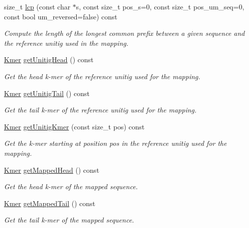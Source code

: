 \begin{DoxyCompactItemize}
size\+\_\+t \hyperlink{classUnitigMap_a2a80f5a0f55391c57b4f4d83400e30a2}{lcp} (const char $\ast$s, const size\+\_\+t pos\+\_\+s=0, const size\+\_\+t pos\+\_\+um\+\_\+seq=0, const bool um\+\_\+reversed=false) const
\begin{DoxyCompactList}\small\item\em Compute the length of the longest common prefix between a given sequence and the reference unitig used in the mapping. \end{DoxyCompactList}\item 
\hyperlink{classKmer}{Kmer} \hyperlink{classUnitigMap_a594c471e4d757273feef67cf4358bafd}{get\+Unitig\+Head} () const
\begin{DoxyCompactList}\small\item\em Get the head k-\/mer of the reference unitig used for the mapping. \end{DoxyCompactList}\item 
\hyperlink{classKmer}{Kmer} \hyperlink{classUnitigMap_a584488d223cb2f5b00d72342305c6d0e}{get\+Unitig\+Tail} () const
\begin{DoxyCompactList}\small\item\em Get the tail k-\/mer of the reference unitig used for the mapping. \end{DoxyCompactList}\item 
\hyperlink{classKmer}{Kmer} \hyperlink{classUnitigMap_a7c8a9b1e16fa29d716550fc93de9d4d7}{get\+Unitig\+Kmer} (const size\+\_\+t pos) const
\begin{DoxyCompactList}\small\item\em Get the k-\/mer starting at position pos in the reference unitig used for the mapping. \end{DoxyCompactList}\item 
\hyperlink{classKmer}{Kmer} \hyperlink{classUnitigMap_a18a15516e136f787dc70db5030698548}{get\+Mapped\+Head} () const
\begin{DoxyCompactList}\small\item\em Get the head k-\/mer of the mapped sequence. \end{DoxyCompactList}\item 
\hyperlink{classKmer}{Kmer} \hyperlink{classUnitigMap_ab06f79aa91086a8d73ea8200f5cc64d4}{get\+Mapped\+Tail} () const
\begin{DoxyCompactList}\small\item\em Get the tail k-\/mer of the mapped sequence. \end{DoxyCompactList}\item 

\end{DoxyCompactItemize}

